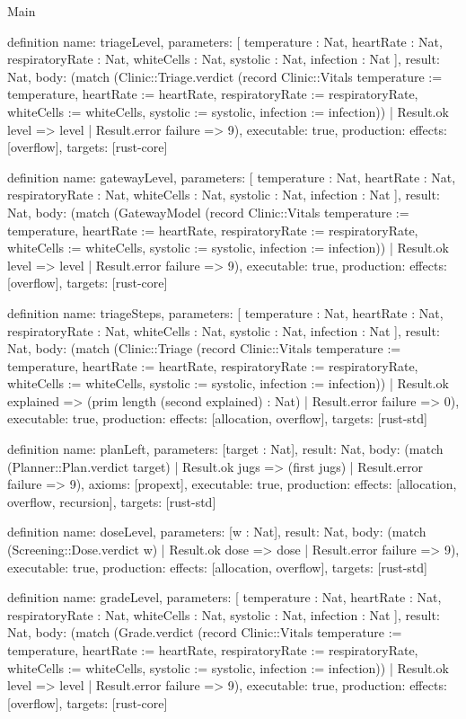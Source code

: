 \begin{lexlean}{Main}
\begin{semanticmodule}
definition{
  name: triageLevel,
  parameters: [
    temperature : Nat,
    heartRate : Nat,
    respiratoryRate : Nat,
    whiteCells : Nat,
    systolic : Nat,
    infection : Nat
  ],
  result: Nat,
  body: (match (Clinic::Triage.verdict (record Clinic::Vitals {temperature := temperature, heartRate := heartRate, respiratoryRate := respiratoryRate, whiteCells := whiteCells, systolic := systolic, infection := infection}))
    | Result.ok level => level
    | Result.error failure => 9),
  executable: true,
  production: {effects: [overflow], targets: [rust-core]}
}

definition{
  name: gatewayLevel,
  parameters: [
    temperature : Nat,
    heartRate : Nat,
    respiratoryRate : Nat,
    whiteCells : Nat,
    systolic : Nat,
    infection : Nat
  ],
  result: Nat,
  body: (match (GatewayModel (record Clinic::Vitals {temperature := temperature, heartRate := heartRate, respiratoryRate := respiratoryRate, whiteCells := whiteCells, systolic := systolic, infection := infection}))
    | Result.ok level => level
    | Result.error failure => 9),
  executable: true,
  production: {effects: [overflow], targets: [rust-core]}
}

definition{
  name: triageSteps,
  parameters: [
    temperature : Nat,
    heartRate : Nat,
    respiratoryRate : Nat,
    whiteCells : Nat,
    systolic : Nat,
    infection : Nat
  ],
  result: Nat,
  body: (match (Clinic::Triage (record Clinic::Vitals {temperature := temperature, heartRate := heartRate, respiratoryRate := respiratoryRate, whiteCells := whiteCells, systolic := systolic, infection := infection}))
    | Result.ok explained => (prim length (second explained) : Nat)
    | Result.error failure => 0),
  executable: true,
  production: {effects: [allocation, overflow], targets: [rust-std]}
}

definition{
  name: planLeft,
  parameters: [target : Nat],
  result: Nat,
  body: (match (Planner::Plan.verdict target)
    | Result.ok jugs => (first jugs)
    | Result.error failure => 9),
  axioms: [propext],
  executable: true,
  production: {effects: [allocation, overflow, recursion], targets: [rust-std]}
}

definition{
  name: doseLevel,
  parameters: [w : Nat],
  result: Nat,
  body: (match (Screening::Dose.verdict w) | Result.ok dose => dose | Result.error failure => 9),
  executable: true,
  production: {effects: [allocation, overflow], targets: [rust-std]}
}

definition{
  name: gradeLevel,
  parameters: [
    temperature : Nat,
    heartRate : Nat,
    respiratoryRate : Nat,
    whiteCells : Nat,
    systolic : Nat,
    infection : Nat
  ],
  result: Nat,
  body: (match (Grade.verdict (record Clinic::Vitals {temperature := temperature, heartRate := heartRate, respiratoryRate := respiratoryRate, whiteCells := whiteCells, systolic := systolic, infection := infection}))
    | Result.ok level => level
    | Result.error failure => 9),
  executable: true,
  production: {effects: [overflow], targets: [rust-core]}
}


\end{semanticmodule}
\end{lexlean}
